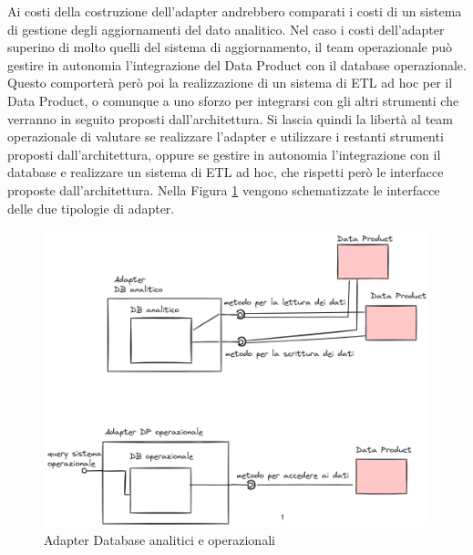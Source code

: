 \documentclass[a4paper,12pt]{report}
\begin{document}
Ai costi della costruzione dell'adapter andrebbero comparati i costi di un sistema di gestione degli aggiornamenti del dato analitico.
Nel caso i costi dell'adapter superino di molto quelli del sistema di aggiornamento, il team operazionale può gestire in autonomia l'integrazione del Data Product con il database operazionale.
Questo comporterà però poi la realizzazione di un sistema di ETL ad hoc per il Data Product, o comunque a uno sforzo per integrarsi con gli altri strumenti che verranno in seguito proposti dall'architettura.
Si lascia quindi la libertà al team operazionale di valutare se realizzare l'adapter e utilizzare i restanti strumenti proposti dall'architettura, oppure se gestire in autonomia l'integrazione con il database e realizzare un sistema di ETL ad hoc, che rispetti però le interfacce proposte dall'architettura.
Nella Figura \ref{fig:AdapterDB} vengono schematizzate le interfacce delle due tipologie di adapter. 

\begin{figure}
    \centering
    \includegraphics[width =\linewidth]{immagini/Data Mesh con DB Adapter 2024-03-06 17.45.31.excalidraw.png}
    \caption{Adapter Database analitici e operazionali}
    \label{fig:AdapterDB}
\end{figure}
\end{document}
